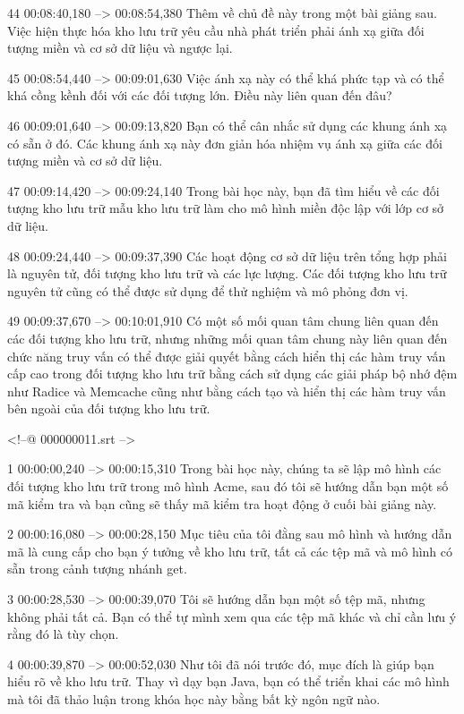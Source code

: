 44
00:08:40,180 --> 00:08:54,380
Thêm về chủ đề này trong một bài giảng sau.  Việc hiện thực hóa kho lưu trữ yêu cầu nhà phát triển phải ánh xạ giữa đối tượng miền và cơ sở dữ liệu và ngược lại.

45
00:08:54,440 --> 00:09:01,630
Việc ánh xạ này có thể khá phức tạp và có thể khá cồng kềnh đối với các đối tượng lớn.  Điều này liên quan đến đâu?

46
00:09:01,640 --> 00:09:13,820
Bạn có thể cân nhắc sử dụng các khung ánh xạ có sẵn ở đó.  Các khung ánh xạ này đơn giản hóa nhiệm vụ ánh xạ giữa các đối tượng miền và cơ sở dữ liệu.

47
00:09:14,420 --> 00:09:24,140
Trong bài học này, bạn đã tìm hiểu về các đối tượng kho lưu trữ mẫu kho lưu trữ làm cho mô hình miền độc lập với lớp cơ sở dữ liệu.

48
00:09:24,440 --> 00:09:37,390
Các hoạt động cơ sở dữ liệu trên tổng hợp phải là nguyên tử, đối tượng kho lưu trữ và các lực lượng.  Các đối tượng kho lưu trữ nguyên tử cũng có thể được sử dụng để thử nghiệm và mô phỏng đơn vị.

49
00:09:37,670 --> 00:10:01,910
Có một số mối quan tâm chung liên quan đến các đối tượng kho lưu trữ, nhưng những mối quan tâm chung này liên quan đến chức năng truy vấn có thể được giải quyết bằng cách hiển thị các hàm truy vấn cấp cao trong đối tượng kho lưu trữ bằng cách sử dụng các giải pháp bộ nhớ đệm như Radice và Memcache cũng như bằng cách tạo và hiển thị các hàm truy vấn bên ngoài  của đối tượng kho lưu trữ.

<!--@ 000000011.srt -->

1
00:00:00,240 --> 00:00:15,310
Trong bài học này, chúng ta sẽ lập mô hình các đối tượng kho lưu trữ trong mô hình Acme, sau đó tôi sẽ hướng dẫn bạn một số mã kiểm tra và bạn cũng sẽ thấy mã kiểm tra hoạt động ở cuối bài giảng này.

2
00:00:16,080 --> 00:00:28,150
Mục tiêu của tôi đằng sau mô hình và hướng dẫn mã là cung cấp cho bạn ý tưởng về kho lưu trữ, tất cả các tệp mã và mô hình có sẵn trong cảnh tượng nhánh get.

3
00:00:28,530 --> 00:00:39,070
Tôi sẽ hướng dẫn bạn một số tệp mã, nhưng không phải tất cả.  Bạn có thể tự mình xem qua các tệp mã khác và chỉ cần lưu ý rằng đó là tùy chọn.

4
00:00:39,870 --> 00:00:52,030
Như tôi đã nói trước đó, mục đích là giúp bạn hiểu rõ về kho lưu trữ.  Thay vì dạy bạn Java, bạn có thể triển khai các mô hình mà tôi đã thảo luận trong khóa học này bằng bất kỳ ngôn ngữ nào.

